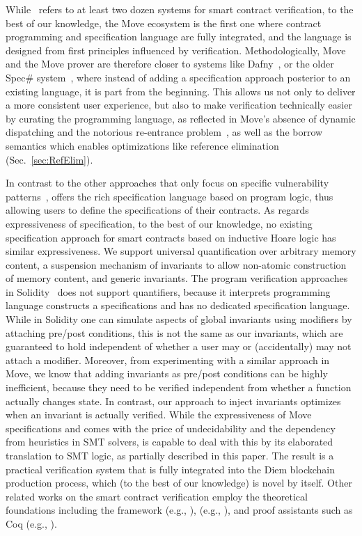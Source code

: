 While~\cite{CONTRACT_VERIFICATION} refers to at least two dozen systems for
smart contract verification, to the best of our knowledge, the Move ecosystem is
the first one where contract programming and specification language are fully
integrated, and the language is designed from first principles influenced by
verification. Methodologically, Move and the Move prover are therefore closer to
systems like Dafny~\cite{DAFNY}, or the older Spec\# system~\cite{SPECSHARP},
where instead of adding a specification approach posterior to an existing
language, it is part from the beginning. This allows us not only to deliver a
more consistent user experience, but also to make verification technically
easier by curating the programming language, as reflected in Move's absence of
dynamic dispatching and the notorious re-entrance problem~\cite{REENTRANCE}, as
well as the borrow semantics which enables optimizations like reference
elimination (Sec.~\ref{sec:RefElim}).

In contrast to the other approaches that only focus on specific vulnerability patterns~\cite{mythril,oyente,maian,securify}, \MVP offers the rich specification language based on program logic, thus allowing users to define the specifications of their contracts.
As regards expressiveness of specification, to the best of our knowledge, no
existing specification approach for smart contracts based on inductive Hoare
logic has similar expressiveness. We support universal quantification over
arbitrary memory content, a suspension mechanism of invariants to allow
non-atomic construction of memory content, and generic invariants.
%
The program verification
approaches in Solidity~\cite{solcverify,DBLP:conf/esop/HajduJ20,verisol} does not support quantifiers, because it
interprets programming language constructs a specifications and has no
dedicated specification language. While in Solidity one can simulate aspects of
global invariants using modifiers by attaching pre/post conditions, this is not
the same as our invariants, which are guaranteed to hold independent of whether
a user may or (accidentally) may not attach a modifier.  Moreover, from
experimenting with a similar approach in Move, we know that adding invariants as
pre/post conditions can be highly inefficient, because they need to be verified
independent from whether a function actually changes state. In contrast, our
approach to inject invariants optimizes when an invariant is actually verified.
While the expressiveness of Move specifications and \MVP comes with the price of
undecidability and the dependency from heuristics in SMT solvers, \MVP is
capable to deal with this by its elaborated translation to SMT logic, as
partially described in this paper. The result is a practical verification system
that is fully integrated into the Diem blockchain production process, which (to
the best of our knowledge) is novel by itself. Other related works on the \solidity smart contract verification employ the theoretical foundations including the \kay framework \cite{kay} (e.g., \cite{kevm}), \fstar \cite{dm4all} (e.g., \cite{DBLP:conf/ccs/BhargavanDFGGKK16,post2018}), and proof assistants such as Coq \cite{coqref} (e.g., \cite{fspvme,fether}).


